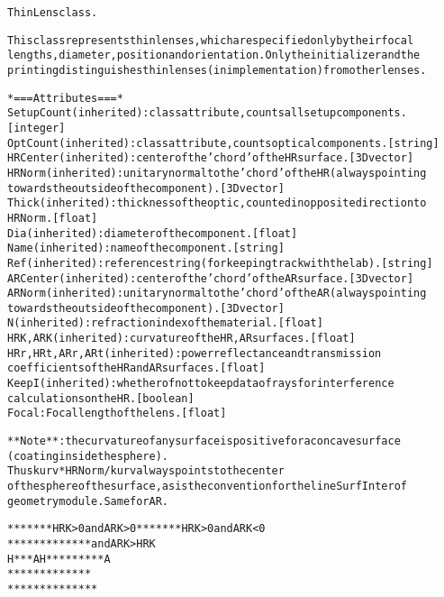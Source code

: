 \begin{alltt}


ThinLens class.

This class represents thin lenses, which are specified only by their focal
lengths, diameter, position and orientation. Only the initializer and the
printing distinguishes thin lenses (in implementation) from other lenses.

*=== Attributes ===*
SetupCount (inherited): class attribute, counts all setup components.
    [integer]
OptCount (inherited): class attribute, counts optical components. [string]
HRCenter (inherited): center of the 'chord' of the HR surface. [3D vector]
HRNorm (inherited): unitary normal to the 'chord' of the HR (always pointing
    towards the outside of the component). [3D vector]
Thick (inherited): thickness of the optic, counted in opposite direction to
    HRNorm. [float]
Dia (inherited): diameter of the component. [float]
Name (inherited): name of the component. [string]
Ref (inherited): reference string (for keeping track with the lab). [string]
ARCenter (inherited): center of the 'chord' of the AR surface. [3D vector]
ARNorm (inherited): unitary normal to the 'chord' of the AR (always pointing
    towards the outside of the component). [3D vector]
N (inherited): refraction index of the material. [float]
HRK, ARK (inherited): curvature of the HR, AR surfaces. [float]
HRr, HRt, ARr, ARt (inherited): power reflectance and transmission
    coefficients of the HR and AR surfaces. [float]
KeepI (inherited): whether of not to keep data of rays for interference
    calculations on the HR. [boolean]
Focal: Focal length of the lens. [float]

**Note**: the curvature of any surface is positive for a concave surface
(coating inside the sphere).
Thus kurv*HRNorm/{\textbar}kurv{\textbar} always points to the center
of the sphere of the surface, as is the convention for the lineSurfInter of
geometry module. Same for AR.

*******     HRK {\textgreater} 0 and ARK {\textgreater} 0     *******           HRK {\textgreater} 0 and ARK {\textless} 0
 *****                               ********         and {\textbar}ARK{\textbar} {\textgreater} {\textbar}HRK{\textbar}
 H***A                               H*********A
 *****                               ********
*******                             *******
\end{alltt}



